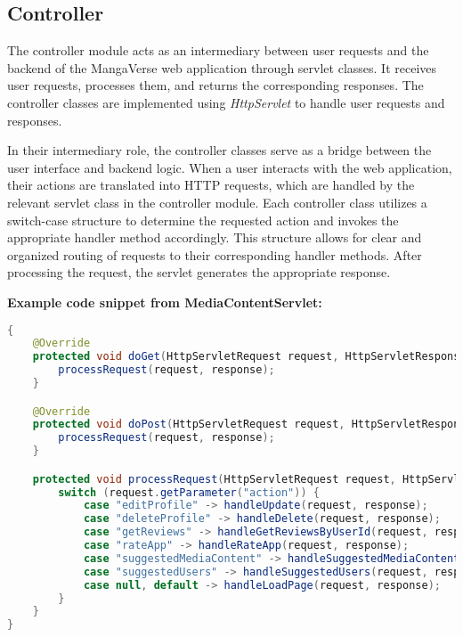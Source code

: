 \subsection*{Controller}

The controller module acts as an intermediary between user requests and the backend of the MangaVerse web application 
through servlet classes. It receives user requests, processes them, and returns the corresponding responses. 
The controller classes are implemented using \textit{HttpServlet} to handle user requests and responses.

\vspace{\baselineskip}

In their intermediary role, the controller classes serve as a bridge between the user interface and backend logic. 
When a user interacts with the web application, their actions are translated into HTTP requests, which are handled 
by the relevant servlet class in the controller module. Each controller class utilizes a switch-case structure to 
determine the requested action and invokes the appropriate handler method accordingly. This structure allows for 
clear and organized routing of requests to their corresponding handler methods. After processing the request, the 
servlet generates the appropriate response.

\vspace{\baselineskip}

\textbf{Example code snippet from MediaContentServlet:}
\begin{mdframed}[style=customstyle]
    \begin{lstlisting}[language=java]
{
    @Override
    protected void doGet(HttpServletRequest request, HttpServletResponse response) throws IOException, ServletException {
        processRequest(request, response);
    }

    @Override
    protected void doPost(HttpServletRequest request, HttpServletResponse response) throws IOException, ServletException {
        processRequest(request, response);
    }

    protected void processRequest(HttpServletRequest request, HttpServletResponse response) throws IOException, ServletException {
        switch (request.getParameter("action")) {
            case "editProfile" -> handleUpdate(request, response);
            case "deleteProfile" -> handleDelete(request, response);
            case "getReviews" -> handleGetReviewsByUserId(request, response);
            case "rateApp" -> handleRateApp(request, response);
            case "suggestedMediaContent" -> handleSuggestedMediaContent(request, response);
            case "suggestedUsers" -> handleSuggestedUsers(request, response);
            case null, default -> handleLoadPage(request, response);
        }
    }
}\end{lstlisting}
\end{mdframed}

